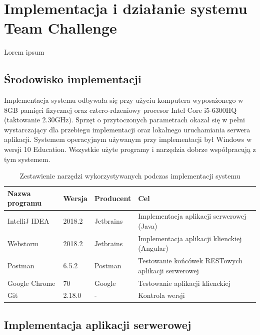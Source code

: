 \chapter{Implementacja i działanie systemu Team Challenge}

Lorem ipsum

\section{Środowisko implementacji}

Implementacja systemu odbywała się przy użyciu komputera wyposażonego w 8GB pamięci fizycznej oraz cztero-rdzeniowy procesor Intel Core i5-6300HQ (taktowanie 2.30GHz). Sprzęt o przytoczonych parametrach okazał się w pełni wystarczający dla przebiegu implementacji oraz lokalnego uruchamiania serwera aplikacji. Systemem operacyjnym używanym przy implementacji był Windows w wersji 10 Education. Wszystkie użyte programy i narzędzia dobrze współpracują z tym systemem.

\begin{table}[H]
\centering\small
\caption{Zestawienie narzędzi wykorzystywanych podczas implementacji systemu}
\label{tab:szablon}
\begin{tabularx}{\linewidth}{|p{.2\linewidth}|p{.1\linewidth}|p{.1\linewidth}|X|}\hline
Nazwa programu & Wersja & Producent & Cel\\ \hline\hline

IntelliJ IDEA & 2018.2 & Jetbrains & Implementacja aplikacji serwerowej (Java) \\ \hline

Webstorm & 2018.2 & Jetbrains & Implementacja aplikacji klienckiej (Angular) \\ \hline

Postman & 6.5.2 & Postman & Testowanie końcówek RESTowych aplikacji serwerowej \\ \hline

Google Chrome & 70 & Google & Testowanie aplikacji klienckiej \\ \hline

Git & 2.18.0 & - & Kontrola wersji \\ \hline

\end{tabularx}
\end{table}

\section{Implementacja aplikacji serwerowej}

